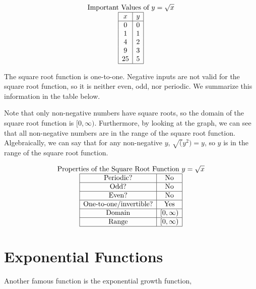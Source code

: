 \documentclass[nooutcomes]{ximera}
\begin{document}
\[
\begin{array}{c }
 \text{\normalfont Important Values of $y=\sqrt{x}$} \\
\begin{array}{|c|c|}
 \hline
 x & y\\
 \hline
 0&0\\
 1&1\\
 4&2\\
 9&3\\
 25&5\\
 \hline
\end{array}
\end{array}
\]

The square root function is one-to-one. Negative inputs are not valid for the square root function, so it is neither even, odd, nor periodic. We summarize this information in the table below.

Note that only non-negative numbers have square roots, so the domain of the square root function is $[0, \infty)$. Furthermore, by looking at the graph, we can see that all non-negative numbers are in the range of the square root function. Algebraically, we can say that for any non-negative $y$, $\sqrt(y^2) = y$, so $y$ is in the range of the square root function.

\[
\begin{array}{c }
 \text{\normalfont Properties of the Square Root Function } y=\sqrt{x} \\
\begin{array}{|c|c|}
 \hline
\text{Periodic?} & \text{No} \\ \hline
\text{Odd?} & \text{No} \\ \hline
\text{Even?} & \text{No} \\ \hline
\text{One-to-one/invertible?} & \text{Yes}\\ \hline
\text{Domain} & [0,\infty)\\ \hline
\text{Range} & [0,\infty)\\ \hline
\end{array}
\end{array}
\]

\newpage


\section{Exponential Functions}
Another famous function is the exponential growth function,
\end{document}
